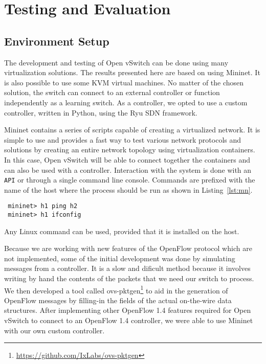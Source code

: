 \chapter{Testing and Evaluation}
\label{chapter:test-eval}  
 
\section{Environment Setup}
\label{chapter:sota} 

The development and testing of Open vSwitch can be done using many virtualization solutions. The
results presented here are based on using Mininet\cite{mn}. It is also possible to use some KVM\cite{kvm}
virtual machines. No matter of the chosen solution, the switch can connect to an
external controller or function independently as a learning switch. As a controller, we opted
to use a custom controller, written in Python, using the Ryu\cite{ryu} SDN framework.

Mininet contains a series of scripts capable of creating a virtualized network. It is simple to
use and provides a fast way to test various network protocols and solutions by creating
an entire network topology using virtualization containers. In this case, Open vSwitch will
be able to connect together the containers and can also be used with a controller.
Interaction with the system is done with an \texttt{API} or through a single command line console.
Commands are prefixed with the name of the host where the process should be run as shown in
Listing~\ref{lst:mn}.
\lstset{caption=Mininet Command Line,label=lst:mn}
\begin{lstlisting}
 mininet> h1 ping h2
 mininet> h1 ifconfig
\end{lstlisting}
Any Linux command can be used, provided that it is installed on the host.

Because we are working with new features of the OpenFlow protocol which are not implemented, some of
the initial development was done by simulating messages from a controller. It is a slow and dificult method
because it involves writing by hand the contents of the packets that we need our switch to process.
We then developed a tool called ovs-pktgen\footnote{\url{https://github.com/IxLabs/ovs-pktgen}}
to aid in the generation of OpenFlow messages by filling-in the fields of the actual on-the-wire
data structures. After implementing other OpenFlow 1.4 features required for Open vSwitch to connect
to an OpenFlow 1.4 controller, we were able to use Mininet with our own custom controller.

